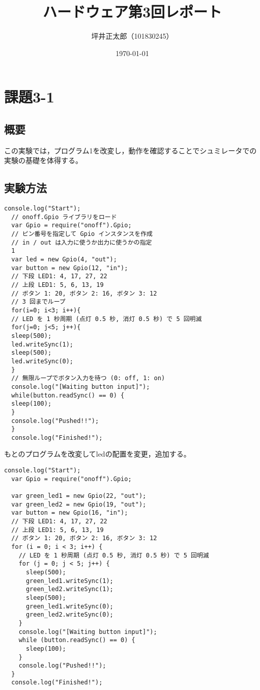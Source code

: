\documentclass[a4paper,10pt]{jsarticle}
\begin{document}
\title{ハードウェア第3回レポート}
\author{坪井正太郎（101830245）}
\date{\today}
\maketitle

\section{課題3-1}
\subsection{概要}
この実験では，プログラム1を改変し，動作を確認することでシュミレータでの実験の基礎を体得する。

\subsection{実験方法}
\begin{lstlisting}[caption={program3-1},label={program3-1}]
  console.log("Start");
  // onoff.Gpio ライブラリをロード
  var Gpio = require("onoff").Gpio;
  // ピン番号を指定して Gpio インスタンスを作成
  // in / out は⼊⼒に使うか出⼒に使うかの指定
  1
  var led = new Gpio(4, "out");
  var button = new Gpio(12, "in");
  // 下段 LED1: 4, 17, 27, 22
  // 上段 LED1: 5, 6, 13, 19
  // ボタン 1: 20, ボタン 2: 16, ボタン 3: 12
  // 3 回までループ
  for(i=0; i<3; i++){
  // LED を 1 秒周期 (点灯 0.5 秒, 消灯 0.5 秒) で 5 回明滅
  for(j=0; j<5; j++){
  sleep(500);
  led.writeSync(1);
  sleep(500);
  led.writeSync(0);
  }
  // 無限ループでボタン⼊⼒を待つ (0: off, 1: on)
  console.log("[Waiting button input]");
  while(button.readSync() == 0) {
  sleep(100);
  }
  console.log("Pushed!!");
  }
  console.log("Finished!");
\end{lstlisting}

もとのプログラムを改変してledの配置を変更，追加する。
\begin{lstlisting}[caption={program3-1d},label={program3-1d}]
  console.log("Start");
  var Gpio = require("onoff").Gpio;

  var green_led1 = new Gpio(22, "out");
  var green_led2 = new Gpio(19, "out");
  var button = new Gpio(16, "in");
  // 下段 LED1: 4, 17, 27, 22
  // 上段 LED1: 5, 6, 13, 19
  // ボタン 1: 20, ボタン 2: 16, ボタン 3: 12
  for (i = 0; i < 3; i++) {
    // LED を 1 秒周期 (点灯 0.5 秒, 消灯 0.5 秒) で 5 回明滅
    for (j = 0; j < 5; j++) {
      sleep(500);
      green_led1.writeSync(1);
      green_led2.writeSync(1);
      sleep(500);
      green_led1.writeSync(0);
      green_led2.writeSync(0);
    }
    console.log("[Waiting button input]");
    while (button.readSync() == 0) {
      sleep(100);
    }
    console.log("Pushed!!");
  }
  console.log("Finished!");
\end{lstlisting}
\end{document}
